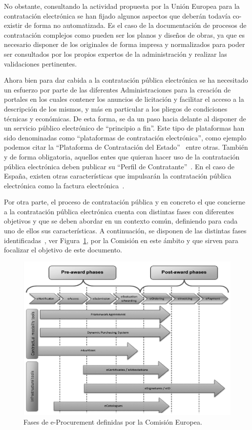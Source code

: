 No obstante, consultando la actividad propuesta por la Unión Europea para la contratación electrónica
se han fijado algunos aspectos que deberán todavía co-existir de forma no automatizada. Es el caso
de la documentación de procesos de contratación complejos como pueden ser los planos y diseños
de obras, ya que es necesario disponer de los originales de forma impresa y normalizados para poder ser consultados por
los propios expertos de la administración y realizar las validaciones pertinentes. 

Ahora bien para dar cabida a la contratación pública electrónica se ha necesitado un esfuerzo por parte
de las diferentes Administraciones para la creación de portales en los cuales contener los anuncios de licitación y facilitar
el acceso a la descripción de los mismos, y más en particular a los pliegos de condiciones técnicas y económicas. 
De esta forma, se da un paso hacia delante al disponer de un servicio público electrónico de ``principio a fin''. 
Este tipo de plataformas han sido denominadas como ``plataformas de contratación electrónica'', como ejemplo
podemos citar la ``Plataforma de Contratación del Estado''~\cite{PlataformaContratacionEstado} entre otras. 
También y de forma obligatoria, aquellos entes que quieran hacer uso de la contratación pública electrónica deben 
publicar su ``Perfil de Contratante''~\cite{PerfilContratante}. En el caso de España, existen otras características que impulsarán la 
contratación pública electrónica como la factura electrónica~\cite{FacturaElectronica}.

Por otra parte, el proceso de contratación pública y en concreto el que concierne a la contratación pública electrónica cuenta
con distintas fases con diferentes objetivos y que se deben abordar en un contexto común, definiendo
para cada uno de ellos sus características. A continuación, se disponen de las distintas fases
identificadas~\cite{siemensEval}, ver Figura~\ref{fig:ted-1}, por la Comisión en este ámbito y que sirven para focalizar el objetivo de este documento.


\begin{figure}[!htb]
\centering
	\includegraphics[width=16cm]{images/phd/eproc/ted-1}
\caption{Fases de e-Procurement definidas por la Comisión Europea.}
\label{fig:ted-1}
\end{figure}


